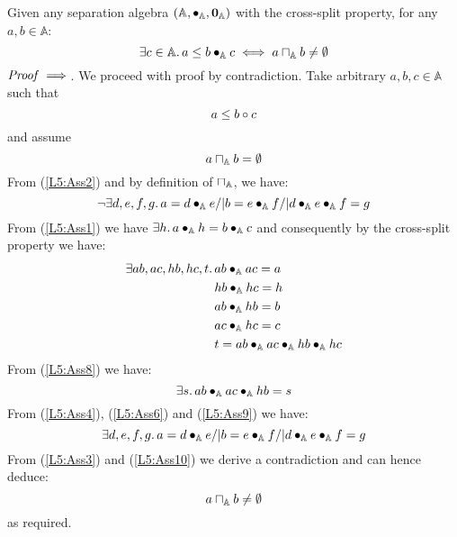 \begin{lemma}[]\label{lem:nonEmptyOverlap}Given any separation algebra $(\mathbb{A}, \bullet_{\mathbb{A}}, \mathbf{0}_{\mathbb{A}})$ with the cross-split property, for any $a, b \in \mathbb{A}$:
%
\[
	\exists c \in \mathbb{A}.\, a \leq b \bullet_{\mathbb{A}} c \iff a \sqcap_{\mathbb{A}} b \not= \emptyset
\]
%
$\mathit{Proof} \implies$. We proceed with proof by contradiction.
Take arbitrary $a, b, c \in \mathbb{A}$ such that 
%
\begin{equation}
	a \leq b \circ c \label{L5:Ass1}
\end{equation}
%
and assume
%
\begin{equation}
	a \sqcap_{\mathbb{A}} b = \emptyset \label{L5:Ass2}
\end{equation}
%
From (\ref{L5:Ass2}) and by definition of $\sqcap_{\mathbb{A}}$, we have:
%
\begin{equation}
	\neg\exists d, e, f, g.\, a = d \bullet_{\mathbb{A}} e /| b = e \bullet_{\mathbb{A}} f /| d \bullet_{\mathbb{A}} e \bullet_{\mathbb{A}} f = g \label{L5:Ass3}
\end{equation}
%
From (\ref{L5:Ass1}) we have $\exists h.\, a \bullet_{\mathbb{A}} h = b \bullet_{\mathbb{A}} c$ and consequently by the cross-split property we have:
%
\begin{align}
	\exists ab, ac, hb, hc, t.\, &
	ab \bullet_{\mathbb{A}} ac = a 	\label{L5:Ass4}\\
	& hb \bullet_{\mathbb{A}} hc = h \label{L5:Ass5}\\
	& ab \bullet_{\mathbb{A}} hb = b \label{L5:Ass6}\\
	& ac \bullet_{\mathbb{A}} hc = c \label{L5:Ass7}\\
	& t = ab \bullet_{\mathbb{A}} ac \bullet_{\mathbb{A}} hb \bullet_{\mathbb{A}} hc \label{L5:Ass8}
\end{align}
%
From (\ref{L5:Ass8}) we have:
%
\begin{equation}
	\exists s.\, ab \bullet_{\mathbb{A}} ac \bullet_{\mathbb{A}} hb = s \label{L5:Ass9}
\end{equation}
%
From (\ref{L5:Ass4}), (\ref{L5:Ass6}) and (\ref{L5:Ass9}) we have: 
%
\begin{equation}
	\exists d, e, f, g.\, a = d \bullet_{\mathbb{A}} e /| b = e \bullet_{\mathbb{A}} f /| d \bullet_{\mathbb{A}} e \bullet_{\mathbb{A}} f = g \label{L5:Ass10}
\end{equation}
%
From (\ref{L5:Ass3}) and (\ref{L5:Ass10}) we derive a contradiction and can hence deduce:
%
\begin{equation}
	a \sqcap_{\mathbb{A}} b \not= \emptyset \nonumber
\end{equation}
%
as required.\\



\end{lemma}
